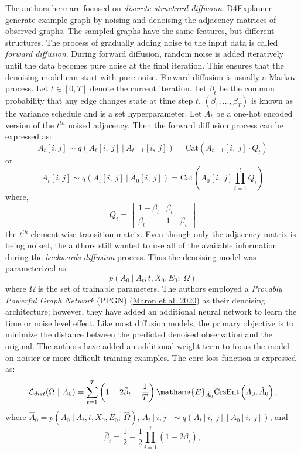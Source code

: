 \documentclass[
  11pt,
  letterpaper,
]{article}
\begin{document}
\quad The authors here are focused on \emph{discrete structural
diffusion}. D4Explainer generate example graph by noising and denoising
the adjacency matrices of observed graphs. The sampled graphs have the
same features, but different structures. The process of gradually adding
noise to the input data is called \emph{forward diffusion}. During
forward diffusion, random noise is added iteratively until the data
becomes pure noise at the final iteration. This ensures that the
denoising model can start with pure noise. Forward diffusion is usually
a Markov process. Let \(t \in [0, T]\) denote the current iteration. Let
\(\beta_t\) be the common probability that any edge changes state at
time step \(t\). \((\beta_1, \dots, \beta_T)\) is known as the variance
schedule and is a set hyperparameter. Let \(A_t\) be a one-hot encoded
version of the \(t^{th}\) noised adjacency. Then the forward diffusion
process can be expressed as:\\
\begin{equation}
         A_t[i, j] \sim q(A_t[i, \ j] \ | \ A_{t-1}[i, \ j]) 
            = \text{Cat}(A_{t-1}[i, \ j] \cdot Q_t)
    \end{equation} or \begin{equation}
         A_t[i, j] \sim q(A_t[i, \ j] \ | \ A_{0}[i, \ j]) 
            = \text{Cat}\left(A_0[i, \ j] \prod_{i=1}^t  Q_i \right)
    \end{equation} where, \[
    Q_t = 
    \left[
    \begin{matrix}
        1-\beta_t & \beta_t \\ 
        \beta_t & 1 - \beta_t
    \end{matrix}
    \right]
    \] the \(t^{th}\) element-wise transition matrix. Even though only
the adjacency matrix is being noised, the authors still wanted to use
all of the available information during the \emph{backwards diffusion}
process. Thus the denoising model was parameterized as: \begin{equation}
         p(A_0 \ | \ A_t, t, X_0, E_0; \ \Omega)  
    \end{equation} where \(\Omega\) is the set of trainable parameters.
The authors employed a \emph{Provably Powerful Graph Network} (PPGN)
(\protect\hyperlink{ref-Maron_Ben-Hamu_Serviansky_Lipman_2020}{Maron et
al. 2020}) as their denoising architecture; however, they have added an
additional neural network to learn the time or noise level effect. Like
most diffusion models, the primary objective is to minimize the distance
between the predicted denoised observation and the original. The authors
have added an additional weight term to focus the model on noisier or
more difficult training examples. The core loss function is expressed
as: \begin{equation} \label{L-dist}
        \mathcal{L}_{dist} (\Omega \ | \ A_0) =  \sum_{t=1}^T 
            \left(1 - 2 \bar \beta_t + \dfrac 1 T \right)
            \mathams{E}_{\hat A_0}
            \text{CrsEnt} \left(
                A_0, \hat A_0
            \right), 
    \end{equation} where
\(\hat A_0 = p(A_0 \ | \ A_t, t, X_0, E_0; \ \hat \Omega)\),
\(A_t[i, j] \sim q(A_t[i, \ j] \ | \ A_{0}[i, \ j])\), and \[
    \bar \beta_t = \frac 1 2 - \frac 1 2 \prod^t_{i=1}(1-2\beta_i), 
\]
\end{document}
